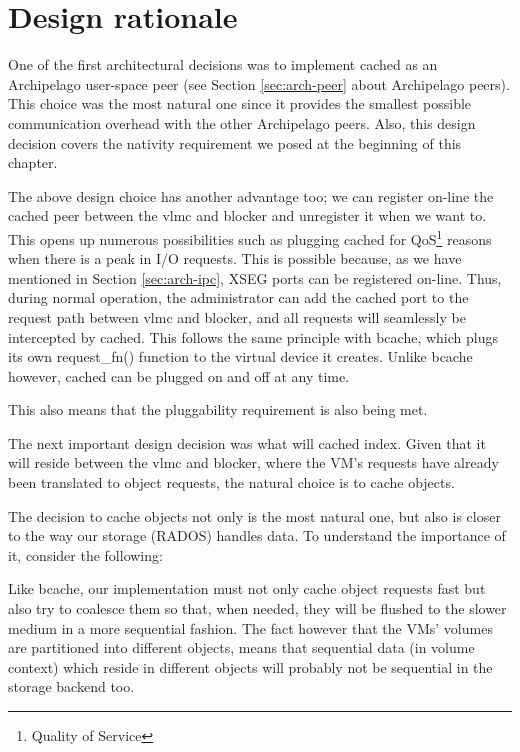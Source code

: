 \section{Design rationale}\label{sec:rationale-design}

One of the first architectural decisions was to implement cached as an 
Archipelago user-space peer (see Section \ref{sec:arch-peer} about Archipelago 
peers). This choice was the most natural one since it provides the smallest 
possible communication overhead with the other Archipelago peers. Also, this 
design decision covers the nativity requirement we posed at the beginning of 
this chapter.

The above design choice has another advantage too; we can register on-line the 
cached peer between the vlmc and blocker and unregister it when we want to.  
This opens up numerous possibilities such as plugging cached for 
QoS\footnote{Quality of Service} reasons when there is a peak in I/O requests.  
This is possible because, as we have mentioned in Section \ref{sec:arch-ipc}, 
XSEG ports can be registered on-line. Thus, during normal operation, the 
administrator can add the cached port to the request path between vlmc and 
blocker, and all requests will seamlessly be intercepted by cached. This 
follows the same principle with bcache, which plugs its own request\_fn() 
function to the virtual device it creates.  Unlike bcache however, cached can 
be plugged on and off at any time.

This also means that the pluggability requirement is also being met.

The next important design decision was what will cached index. Given that it 
will reside between the vlmc and blocker, where the VM's requests have already 
been translated to object requests, the natural choice is to cache objects.  

The decision to cache objects not only is the most natural one, but also is 
closer to the way our storage (RADOS) handles data. To understand the 
importance of it, consider the following:

Like bcache, our implementation must not only cache object requests fast but 
also try to coalesce them so that, when needed, they will be flushed to the 
slower medium in a more sequential fashion. The fact however that the VMs' 
volumes are partitioned into different objects, means that sequential data (in 
volume context) which reside in different objects will probably not be 
sequential in the storage backend too.

